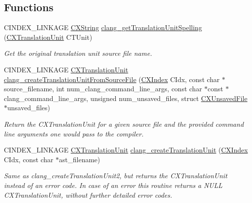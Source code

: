 \subsection*{Functions}
\begin{DoxyCompactItemize}
\item 
\mbox{\label{group__CINDEX__TRANSLATION__UNIT_ga7fb521c65f3aeb15b977d910098ceb0d}} 
C\+I\+N\+D\+E\+X\+\_\+\+L\+I\+N\+K\+A\+GE \hyperlink{structCXString}{C\+X\+String} \hyperlink{group__CINDEX__TRANSLATION__UNIT_ga7fb521c65f3aeb15b977d910098ceb0d}{clang\+\_\+get\+Translation\+Unit\+Spelling} (\hyperlink{group__CINDEX_gacdb7815736ca709ce9a5e1ec2b7e16ac}{C\+X\+Translation\+Unit} C\+T\+Unit)
\begin{DoxyCompactList}\small\item\em Get the original translation unit source file name. \end{DoxyCompactList}\item 
C\+I\+N\+D\+E\+X\+\_\+\+L\+I\+N\+K\+A\+GE \hyperlink{group__CINDEX_gacdb7815736ca709ce9a5e1ec2b7e16ac}{C\+X\+Translation\+Unit} \hyperlink{group__CINDEX__TRANSLATION__UNIT_gaf45dfbcd2e4d8e9eeab4778f994a74c3}{clang\+\_\+create\+Translation\+Unit\+From\+Source\+File} (\hyperlink{group__CINDEX_gae039c2574bfd75774ca7a9a3e55910cb}{C\+X\+Index} C\+Idx, const char $\ast$source\+\_\+filename, int num\+\_\+clang\+\_\+command\+\_\+line\+\_\+args, const char $\ast$const $\ast$clang\+\_\+command\+\_\+line\+\_\+args, unsigned num\+\_\+unsaved\+\_\+files, struct \hyperlink{structCXUnsavedFile}{C\+X\+Unsaved\+File} $\ast$unsaved\+\_\+files)
\begin{DoxyCompactList}\small\item\em Return the C\+X\+Translation\+Unit for a given source file and the provided command line arguments one would pass to the compiler. \end{DoxyCompactList}\item 
\mbox{\label{group__CINDEX__TRANSLATION__UNIT_ga0659baf7f04381286ec54b439760c8f3}} 
C\+I\+N\+D\+E\+X\+\_\+\+L\+I\+N\+K\+A\+GE \hyperlink{group__CINDEX_gacdb7815736ca709ce9a5e1ec2b7e16ac}{C\+X\+Translation\+Unit} \hyperlink{group__CINDEX__TRANSLATION__UNIT_ga0659baf7f04381286ec54b439760c8f3}{clang\+\_\+create\+Translation\+Unit} (\hyperlink{group__CINDEX_gae039c2574bfd75774ca7a9a3e55910cb}{C\+X\+Index} C\+Idx, const char $\ast$ast\+\_\+filename)
\begin{DoxyCompactList}\small\item\em Same as {\ttfamily clang\+\_\+create\+Translation\+Unit2}, but returns the {\ttfamily C\+X\+Translation\+Unit} instead of an error code. In case of an error this routine returns a {\ttfamily N\+U\+LL} {\ttfamily C\+X\+Translation\+Unit}, without further detailed error codes. \end{DoxyCompactList}\item 

\end{DoxyCompactItemize}

